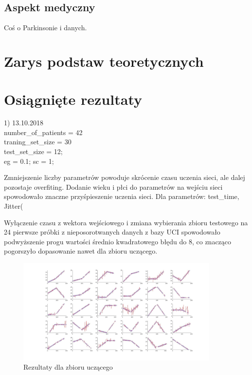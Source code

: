 \documentclass{article}
\begin{document}
\subsection{Aspekt medyczny}

Coś o Parkinsonie i danych.

\section{Zarys podstaw teoretycznych}

\section{Osiągnięte rezultaty}

1) 13.10.2018 \\


number\_of\_patients = 42\\
traning\_set\_size = 30\\
test\_set\_size = 12;\\

eg = 0.1; %
sc = 1;    %

Zmniejszenie liczby parametrów powoduje skrócenie czasu uczenia sieci, ale dalej pozostaje overfiting. Dodanie wieku i płci do parametrów na wejściu sieci spowodowało znaczne przyśpieszenie uczenia sieci. Dla parametrów: test\_time, Jitter(%

Wyłączenie czasu z wektora wejściowego i zmiana wybierania zbioru testowego na 24 pierwsze próbki z nieposorotwanych danych z bazy UCI spowodowało podwyższenie progu wartości średnio kwadratowego błędu do 8, co znacząco pogorszyło dopasowanie nawet dla zbioru uczącego.





\begin{figure}
\centering
	\includegraphics[width=0.90\textwidth]{fig1.jpg}\par\vspace{1cm}
\caption{Rezultaty dla zbioru uczącego}
	\label{fig:features}
\end{figure}
\end{document}
